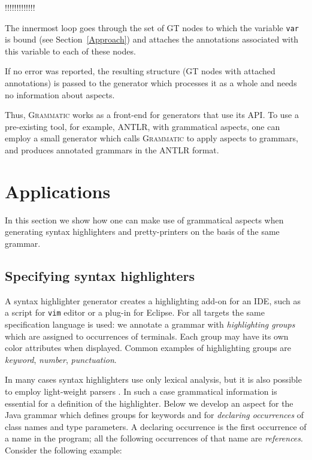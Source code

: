 \documentclass{IOS-Book-Article}     %
\newcommand{\secref}[1]{Section~\ref{#1}}
\newcommand{\tool}[1]{\textsc{#1}}
\newcommand{\Grammatic}[0]{\tool{Grammatic}}
\newcommand{\var}[1]{\texttt{#1}}%
\begin{document}
!!!!!!!!!!!!!

The innermost loop goes through the set of GT nodes to which the variable \var{var} is bound (see \secref{Approach}) and attaches the annotations associated with this variable to each of these nodes.

If no error was reported, the resulting structure (GT nodes with attached annotations) is passed to the generator which processes it as a whole and needs no information about aspects. 

Thus, \Grammatic{} works as a front-end for generators that use its API. To use a pre-existing tool, for example, \tool{ANTLR}, with grammatical aspects, one can employ a small generator which calls \Grammatic{} to apply aspects to grammars, and produces annotated grammars in the ANTLR format.

\section{Applications}\label{Example}
In this section we show how one can make use of grammatical aspects when generating syntax highlighters and pretty-printers on the basis of the same grammar.
\subsection{Specifying syntax highlighters}

A syntax highlighter generator creates a highlighting add-on for an IDE, such as a script for \texttt{vim} editor or a plug-in for Eclipse. For all targets the same specification language is used: we annotate a grammar with \emph{highlighting groups} which are assigned to occurrences of terminals. Each group may have its own color attributes when displayed. Common examples of highlighting groups are \emph{keyword}, \emph{number}, \emph{punctuation}. 

In many cases syntax highlighters use only lexical analysis, but it is also possible to employ light-weight parsers \cite{Island}. In such a case grammatical information is essential for a definition of the highlighter. Below we develop an aspect for the Java grammar which defines groups for keywords and for \emph{declaring occurrences} of class names and type parameters. A declaring occurrence is the first occurrence of a name in the program; all the following occurrences of that name are \emph{references}. Consider the following example:
\end{document}
